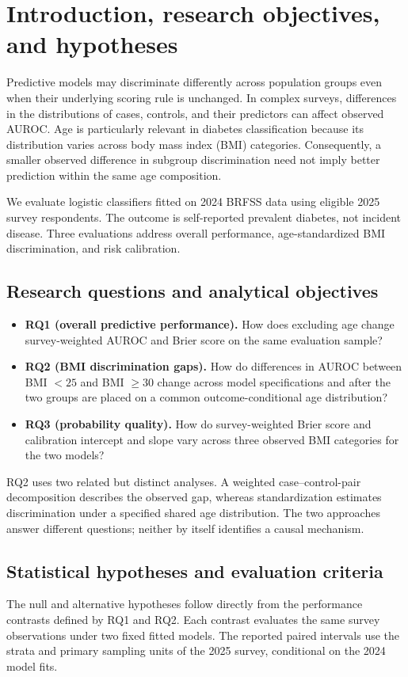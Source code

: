 \section{Introduction, research objectives, and hypotheses}
Predictive models may discriminate differently across population groups even when their underlying scoring rule is unchanged. In complex surveys, differences in the distributions of cases, controls, and their predictors can affect observed AUROC. Age is particularly relevant in diabetes classification because its distribution varies across body mass index (BMI) categories. Consequently, a smaller observed difference in subgroup discrimination need not imply better prediction within the same age composition.

We evaluate logistic classifiers fitted on 2024 BRFSS data using eligible 2025 survey respondents. The outcome is self-reported prevalent diabetes, not incident disease. Three evaluations address overall performance, age-standardized BMI discrimination, and risk calibration.

\subsection{Research questions and analytical objectives}
\begin{itemize}
\item \textbf{RQ1 (overall predictive performance).} How does excluding age change survey-weighted AUROC and Brier score on the same evaluation sample?
\item \textbf{RQ2 (BMI discrimination gaps).} How do differences in AUROC between BMI $<25$ and BMI $\geq30$ change across model specifications and after the two groups are placed on a common outcome-conditional age distribution?
\item \textbf{RQ3 (probability quality).} How do survey-weighted Brier score and calibration intercept and slope vary across three observed BMI categories for the two models?
\end{itemize}

RQ2 uses two related but distinct analyses. A weighted case--control-pair decomposition describes the observed gap, whereas standardization estimates discrimination under a specified shared age distribution. The two approaches answer different questions; neither by itself identifies a causal mechanism.

\subsection{Statistical hypotheses and evaluation criteria}\label{sec:study1_hypotheses}
The null and alternative hypotheses follow directly from the performance contrasts defined by RQ1 and RQ2. Each contrast evaluates the same survey observations under two fixed fitted models. The reported paired intervals use the strata and primary sampling units of the 2025 survey, conditional on the 2024 model fits.

